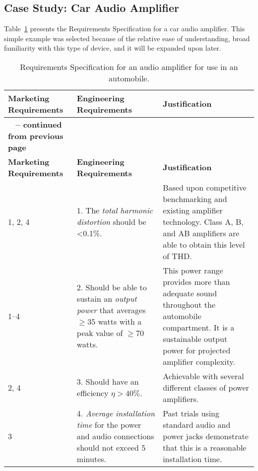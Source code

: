 \subsection{Case Study: Car Audio Amplifier}
\label{subsection:case-study-car-audio-amplifier}

Table~\ref{table:audioRequireSpec} presents the Requirements Specification for a car audio
amplifier. This simple example was selected because of the relative ease
of understanding, broad familiarity with this type of device, and it
will be expanded upon later.

\begin{longtable}{ |p{2.5cm}|p{5cm}|p{5.5cm}|} 
\caption{Requirements Specification for an audio amplifier for use in an automobile.}
\label{table:audioRequireSpec} \\

\hline
\rowcolor{Gray}
\textbf{Marketing Requirements} & \textbf{Engineering Requirements} & \textbf{Justification} \\ \hline
\endfirsthead

\hline
\rowcolor{Gray}
\multicolumn{3}{|c|}
{{\bfseries \tablename\ \thetable{} -- continued from previous page}} \\ \hline
\rowcolor{Gray}
\textbf{Marketing Requirements} & \textbf{Engineering Requirements} & \textbf{Justification} \\ \hline
\endhead
\endfoot
                           
1, 2, 4 &
1.  The \emph{total harmonic distortion} should be \textless0.1\%. &
Based upon competitive benchmarking and existing
amplifier technology. Class A, B, and AB amplifiers are able to obtain
this level of THD. \\ \hline

1--4 & 
2.   Should be able to sustain an \emph{output power} that averages $\ge 35$
  watts with a peak value of $\ge 70$ watts. & 
This power range provides more than adequate sound
throughout the automobile compartment. It is a sustainable output power
for projected amplifier complexity. \\ \hline

2, 4 & 
3. Should have an efficiency $\eta > 40\%$. &
Achievable with several different classes of power amplifiers. \\ \hline

3 & 
4.   \emph{Average installation time} for the power and audio connections
  should not exceed 5 minutes. &
Past trials using standard audio and power jacks
demonstrate that this is a reasonable installation time. \\ \hline


\end{longtable}
